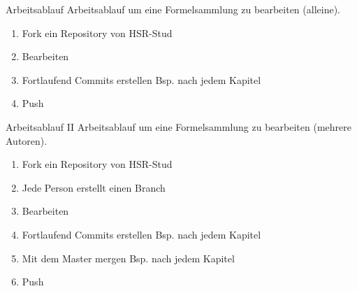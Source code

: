 \begin{frame}{Arbeitsablauf}
	Arbeitsablauf um eine Formelsammlung zu bearbeiten (alleine).
	\begin{enumerate}
		\item Fork ein Repository von HSR-Stud \pause
		\item Bearbeiten \pause
		\item Fortlaufend Commits erstellen Bsp. nach jedem Kapitel \pause
		\item Push
	\end{enumerate}
\end{frame}

\begin{frame}{Arbeitsablauf II}
Arbeitsablauf um eine Formelsammlung zu bearbeiten (mehrere Autoren).
\begin{enumerate}
	\item Fork ein Repository von HSR-Stud  \pause
	\item Jede Person erstellt einen Branch \pause
	\item Bearbeiten \pause
	\item Fortlaufend Commits erstellen Bsp. nach jedem Kapitel \pause
	\item Mit dem Master mergen Bsp. nach jedem Kapitel \pause
	\item Push
\end{enumerate}
\end{frame}
